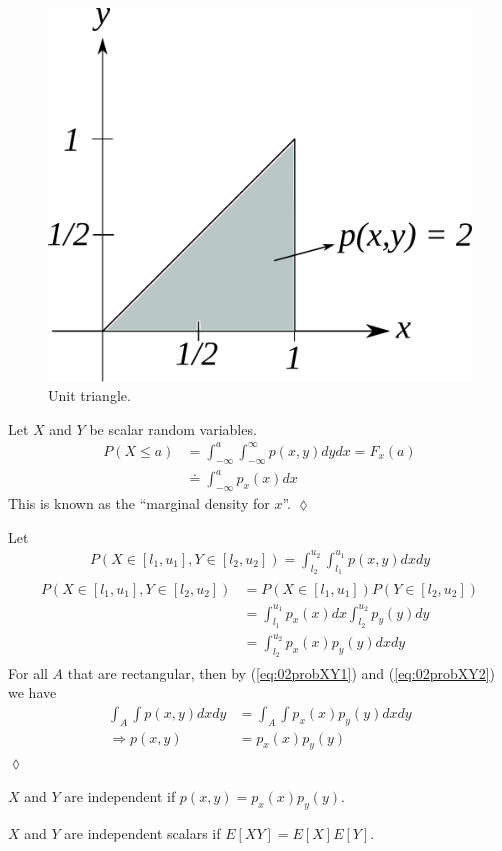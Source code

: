 \begin{figure}[ht!]
\centering
\includegraphics[width=.3\textwidth]{images/02unitTriangle}
\caption{Unit triangle.}
\label{fig:02unitTriangle}
\end{figure}

\begin{example}
Let $X$ and $Y$ be scalar random variables.
\begin{align*}
P(X\leq a) &= \int_{-\infty}^a \int_{-\infty}^\infty p(x,y)dydx = F_x(a) \\
&\doteq \int_{-\infty}^a p_x(x)dx
\end{align*}
This is known as the ``marginal density for $x$''.
$\lozenge$
\end{example}

\begin{example}
Let
\begin{align}
\label{eq:02probXY1}
P(X\in[l_1,u_1], Y\in[l_2,u_2]) = \int_{l_2}^{u_2} \int_{l_1}^{u_1} p(x,y)dxdy
\end{align}
\begin{align}
\label{eq:02probXY2}
\begin{split}
P(X\in[l_1,u_1], Y\in[l_2,u_2]) &= P(X\in[l_1,u_1]) P(Y\in[l_2,u_2]) \\
&= \int_{l_1}^{u_1}p_x(x)dx \int_{l_2}^{u_2}p_y(y)dy \\
&= \int_{l_2}^{u_2}p_x(x)p_y(y)dxdy
\end{split}
\end{align}
For all $A$ that are rectangular, then by (\ref{eq:02probXY1}) and (\ref{eq:02probXY2}) we have
\begin{align*}
\int_A\int p(x,y)dxdy &= \int_A\int p_x(x)p_y(y)dxdy \\
\Rightarrow p(x,y) &= p_x(x)p_y(y)
\end{align*}
$\lozenge$
\end{example}

\begin{theorem}
$X$ and $Y$ are independent if $p(x,y) = p_x(x)p_y(y)$.
\end{theorem}

\begin{theorem}
$X$ and $Y$ are independent scalars if $E[XY] = E[X]E[Y]$.
\end{theorem}

